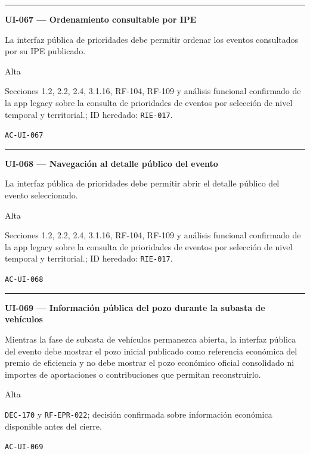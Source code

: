 \documentclass[10pt,letterpaper]{article}
\begin{document}
\vspace{0.25em}\hrule\vspace{0.65em}
\noindent\textbf{UI-067 --- Ordenamiento consultable por IPE}\par
\begin{description}[style=nextline,leftmargin=3.15cm,labelwidth=2.8cm,font=\normalfont\bfseries]
\item[Obligación] La interfaz pública de prioridades debe permitir ordenar los eventos consultados por su IPE publicado.
\item[Prioridad] Alta
\item[Procedencia] Secciones 1.2, 2.2, 2.4, 3.1.16, RF-104, RF-109 y análisis funcional confirmado de la app legacy sobre la consulta de prioridades de eventos por selección de nivel temporal y territorial.; ID heredado: \texttt{RIE-017}.
\item[Verificación] \texttt{AC-UI-067}
\end{description}
\vspace{0.25em}\hrule\vspace{0.65em}
\noindent\textbf{UI-068 --- Navegación al detalle público del evento}\par
\begin{description}[style=nextline,leftmargin=3.15cm,labelwidth=2.8cm,font=\normalfont\bfseries]
\item[Obligación] La interfaz pública de prioridades debe permitir abrir el detalle público del evento seleccionado.
\item[Prioridad] Alta
\item[Procedencia] Secciones 1.2, 2.2, 2.4, 3.1.16, RF-104, RF-109 y análisis funcional confirmado de la app legacy sobre la consulta de prioridades de eventos por selección de nivel temporal y territorial.; ID heredado: \texttt{RIE-017}.
\item[Verificación] \texttt{AC-UI-068}
\end{description}
\vspace{0.25em}\hrule\vspace{0.65em}
\noindent\textbf{UI-069 --- Información pública del pozo durante la subasta de vehículos}\par
\begin{description}[style=nextline,leftmargin=3.15cm,labelwidth=2.8cm,font=\normalfont\bfseries]
\item[Obligación] Mientras la fase de subasta de vehículos permanezca abierta, la interfaz pública del evento debe mostrar el pozo inicial publicado como referencia económica del premio de eficiencia y no debe mostrar el pozo económico oficial consolidado ni importes de aportaciones o contribuciones que permitan reconstruirlo.
\item[Prioridad] Alta
\item[Procedencia] \texttt{DEC-170} y \texttt{RF-EPR-022}; decisión confirmada sobre información económica disponible antes del cierre.
\item[Verificación] \texttt{AC-UI-069}
\end{description}
\end{document}
